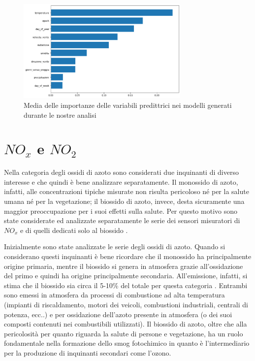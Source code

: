 \documentclass[a4paper]{report}
\begin{document}
\begin{figure}[h]
\centering
\includegraphics[width=0.75\textwidth]{intro_importanza_totale}
\caption{Media delle importanze delle variabili predittrici nei modelli generati durante le nostre analisi}
\label{fig:importanza_tot}
\end{figure}

\section{$NO_x$ e $NO_2$}
Nella categoria degli ossidi di azoto sono considerati due inquinanti di diverso interesse e che quindi è bene analizzare separatamente. Il monossido di azoto, infatti, alle concentrazioni tipiche misurate non risulta pericoloso né per la salute umana né per la vegetazione; il biossido di azoto, invece, desta sicuramente una maggior preoccupazione per i suoi effetti sulla salute. Per questo motivo sono state considerate ed analizzate separatamente le serie dei sensori misuratori di $NO_x$ e di quelli dedicati solo al biossido \cite{world2006air}.

Inizialmente sono state analizzate le serie degli ossidi di azoto. Quando si considerano questi inquinanti è bene ricordare che il monossido ha principalmente origine primaria, mentre il biossido si genera in atmosfera grazie all'ossidazione del primo e quindi ha origine principalmente secondaria. All'emissione, infatti, si stima che il biossido sia circa il 5-10\% del totale per questa categoria \cite{arpa2018rapporto}.  
Entrambi sono emessi in atmosfera da processi di combustione ad alta temperatura (impianti di riscaldamento, motori dei veicoli, combustioni industriali, centrali di potenza, ecc..) e per ossidazione dell'azoto presente in atmosfera (o dei suoi composti contenuti nei combustibili utilizzati). Il biossido di azoto, oltre che alla pericolosità per quanto riguarda la salute di persone e vegetazione, ha un ruolo fondamentale nella formazione dello smog fotochimico in quanto è l'intermediario per la produzione di inquinanti secondari come l'ozono.
\end{document}
